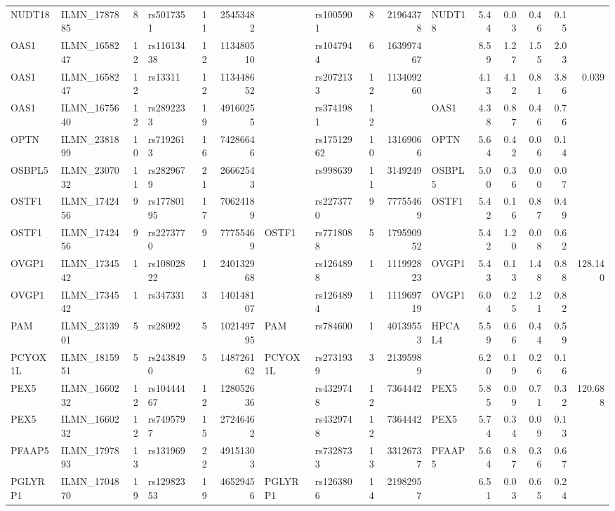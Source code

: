 \documentclass{article}
\begin{document}
\begin{landscape}
{\begin{ThreePartTable}
\begin{longtable}{|llr|lrrl|lrrl|rrrr|r|}
  NUDT18 & ILMN\_1787885 & 8 & rs5017351 & 11 & 25453482 &  & rs1005901 & 8 & 21964378 & NUDT18 & 5.44 & 0.03 & 0.46 & 0.15 &  \\
  OAS1 & ILMN\_1658247 & 12 & rs11613438 & 12 & 113480510 &  & rs1047944 & 6 & 163997467 &  & 8.59 & 1.27 & 1.55 & 2.03 &  \\
  OAS1 & ILMN\_1658247 & 12 & rs13311 & 12 & 113448652 &  & rs2072133 & 12 & 113409260 &  & 4.13 & 4.12 & 0.81 & 3.86 & 0.039 \\
  OAS1 & ILMN\_1675640 & 12 & rs2892233 & 19 & 49160255 &  & rs3741981 & 12 &  & OAS1 & 4.38 & 0.87 & 0.46 & 0.76 &  \\
  OPTN & ILMN\_2381899 & 10 & rs7192613 & 16 & 74286646 &  & rs17512962 & 10 & 13169066 & OPTN & 5.64 & 0.42 & 0.06 & 0.14 &  \\
  OSBPL5 & ILMN\_2307032 & 11 & rs2829679 & 21 & 26662543 &  & rs998639 & 11 & 3149249 & OSBPL5 & 5.00 & 0.36 & 0.00 & 0.07 &  \\
  OSTF1 & ILMN\_1742456 & 9 & rs17780195 & 17 & 70624189 &  & rs2273770 & 9 & 77755469 & OSTF1 & 5.42 & 0.16 & 0.87 & 0.49 &  \\
  OSTF1 & ILMN\_1742456 & 9 & rs2273770 & 9 & 77755469 & OSTF1 & rs7718088 & 5 & 179590952 &  & 5.42 & 1.20 & 0.08 & 0.62 &  \\
  OVGP1 & ILMN\_1734542 & 1 & rs10802822 & 1 & 240132968 &  & rs1264898 & 1 & 111992823 & OVGP1 & 5.43 & 0.13 & 1.48 & 0.88 & 128.140 \\
  OVGP1 & ILMN\_1734542 & 1 & rs347331 & 3 & 140148107 &  & rs1264894 & 1 & 111969719 & OVGP1 & 6.04 & 0.25 & 1.21 & 0.82 &  \\
  PAM & ILMN\_2313901 & 5 & rs28092 & 5 & 102149795 & PAM & rs784600 & 1 & 40139553 & HPCAL4 & 5.59 & 0.66 & 0.44 & 0.59 &  \\
  PCYOX1L & ILMN\_1815951 & 5 & rs2438490 & 5 & 148726162 & PCYOX1L & rs2731939 & 3 & 21395989 &  & 6.20 & 0.19 & 0.26 & 0.16 &  \\
  PEX5 & ILMN\_1660232 & 12 & rs10444467 & 12 & 128052636 &  & rs4329748 & 12 & 7364442 & PEX5 & 5.85 & 0.09 & 0.71 & 0.32 & 120.688 \\
  PEX5 & ILMN\_1660232 & 12 & rs7495797 & 15 & 27246462 &  & rs4329748 & 12 & 7364442 & PEX5 & 5.74 & 0.34 & 0.09 & 0.13 &  \\
  PFAAP5 & ILMN\_1797893 & 13 & rs131969 & 22 & 49151303 &  & rs7328733 & 13 & 33126737 & PFAAP5 & 5.64 & 0.87 & 0.36 & 0.67 &  \\
  PGLYRP1 & ILMN\_1704870 & 19 & rs12982353 & 19 & 46529456 & PGLYRP1 & rs1263806 & 14 & 21982957 &  & 6.51 & 0.03 & 0.65 & 0.24 &  \\

\end{longtable}
\end{ThreePartTable}}
\end{landscape}
\end{document}
